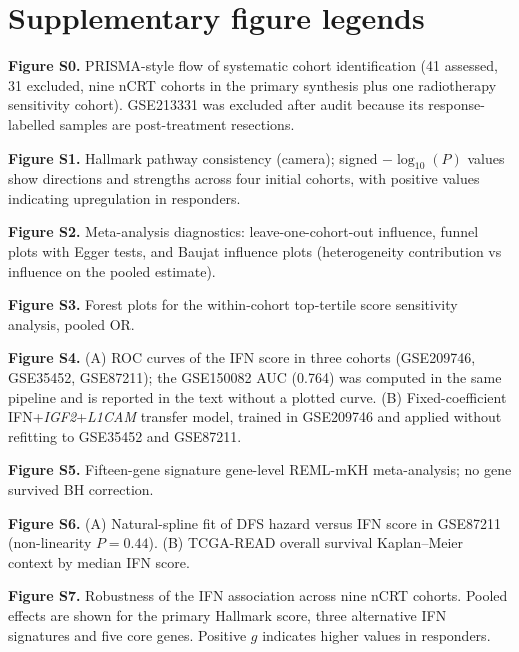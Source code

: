 \documentclass[11pt,a4paper]{article}
\begin{document}
\section*{Supplementary figure legends}

\noindent\textbf{Figure S0.} PRISMA-style flow of systematic cohort identification (41 assessed, 31 excluded, nine nCRT cohorts in the primary synthesis plus one radiotherapy sensitivity cohort). GSE213331 was excluded after audit because its response-labelled samples are post-treatment resections.

\vspace{0.3em}
\noindent\textbf{Figure S1.} Hallmark pathway consistency (camera); signed $-\log_{10}(P)$ values show directions and strengths across four initial cohorts, with positive values indicating upregulation in responders.

\vspace{0.3em}
\noindent\textbf{Figure S2.} Meta-analysis diagnostics: leave-one-cohort-out influence, funnel plots with Egger tests, and Baujat influence plots (heterogeneity contribution vs influence on the pooled estimate).

\vspace{0.3em}
\noindent\textbf{Figure S3.} Forest plots for the within-cohort top-tertile score sensitivity analysis, pooled OR.

\vspace{0.3em}
\noindent\textbf{Figure S4.} (A) ROC curves of the IFN score in three cohorts (GSE209746, GSE35452, GSE87211); the GSE150082 AUC (0.764) was computed in the same pipeline and is reported in the text without a plotted curve. (B) Fixed-coefficient IFN+\textit{IGF2}+\textit{L1CAM} transfer model, trained in GSE209746 and applied without refitting to GSE35452 and GSE87211.

\vspace{0.3em}
\noindent\textbf{Figure S5.} Fifteen-gene signature gene-level REML-mKH meta-analysis; no gene survived BH correction.

\vspace{0.3em}
\noindent\textbf{Figure S6.} (A) Natural-spline fit of DFS hazard versus IFN score in GSE87211 (non-linearity $P=0.44$). (B) TCGA-READ overall survival Kaplan--Meier context by median IFN score.

\vspace{0.3em}
\noindent\textbf{Figure S7.} Robustness of the IFN association across nine nCRT cohorts. Pooled effects are shown for the primary Hallmark score, three alternative IFN signatures and five core genes. Positive $g$ indicates higher values in responders.
\end{document}
